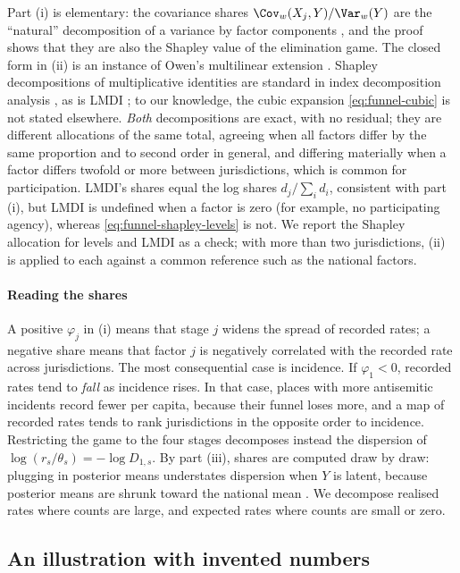Part (i) is elementary: the covariance shares $\Cov_w(X_j,Y)/\Var_w(Y)$ are the ``natural'' decomposition of a variance by factor components \citep{shorrocks1982}, and the proof shows that they are also the Shapley value of the elimination game. The closed form in (ii) is an instance of Owen's multilinear extension \citep{owen1972}. Shapley decompositions of multiplicative identities are standard in index decomposition analysis \citep{albrecht2002}, as is LMDI \citep{ang2004,ang2015}; to our knowledge, the cubic expansion \eqref{eq:funnel-cubic} is not stated elsewhere.
\emph{Both} decompositions are exact, with no residual; they are different allocations of the same total, agreeing when all factors differ by the same proportion and to second order in general, and differing materially when a factor differs twofold or more between jurisdictions, which is common for participation. LMDI's shares equal the log shares $d_j/\sum_id_i$, consistent with part (i), but LMDI is undefined when a factor is zero (for example, no participating agency), whereas \eqref{eq:funnel-shapley-levels} is not. We report the Shapley allocation for levels and LMDI as a check; with more than two jurisdictions, (ii) is applied to each against a common reference such as the national factors.

\paragraph{Reading the shares} A positive $\varphi_j$ in (i) means that stage $j$ widens the spread of recorded rates; a negative share means that factor $j$ is negatively correlated with the recorded rate across jurisdictions. The most consequential case is incidence. If $\varphi_1<0$, recorded rates tend to \emph{fall} as incidence rises. In that case, places with more antisemitic incidents record fewer per capita, because their funnel loses more, and a map of recorded rates tends to rank jurisdictions in the opposite order to incidence. Restricting the game to the four stages decomposes instead the dispersion of $\log(r_s/\theta_s)=-\log D_{1,s}$. By part (iii), shares are computed draw by draw: plugging in posterior means understates dispersion when $Y$ is latent, because posterior means are shrunk toward the national mean \citep{louis1984}. We decompose realised rates where counts are large, and expected rates where counts are small or zero.

\subsection{An illustration with invented numbers}\label{sec:funnel-illustration}


